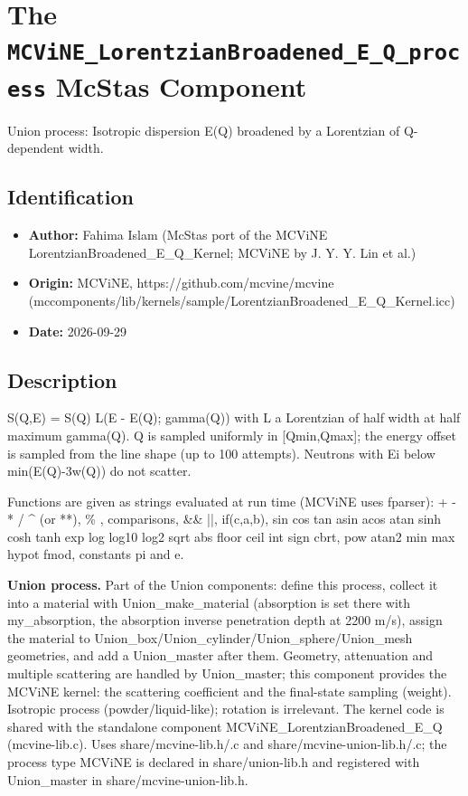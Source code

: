 \section{The \texttt{MCViNE\_LorentzianBroadened\_E\_Q\_process} McStas Component}
Union process: Isotropic dispersion E(Q) broadened by a Lorentzian of Q-dependent width.

\subsection*{Identification}
\begin{itemize}
  \item \textbf{Author:} Fahima Islam (McStas port of the MCViNE LorentzianBroadened\_E\_Q\_Kernel; MCViNE by J. Y. Y. Lin et al.)
  \item \textbf{Origin:} MCViNE, https://github.com/mcvine/mcvine (mccomponents/lib/kernels/sample/LorentzianBroadened\_E\_Q\_Kernel.icc)
  \item \textbf{Date:} 2026-09-29
\end{itemize}

\subsection*{Description}
S(Q,E) = S(Q) L(E - E(Q); gamma(Q)) with L a Lorentzian of half width at half maximum gamma(Q). Q is sampled uniformly in [Qmin,Qmax]; the energy offset is sampled from the line shape (up to 100 attempts). Neutrons with Ei below min(E(Q)-3w(Q)) do not scatter.

Functions are given as strings evaluated at run time (MCViNE uses fparser): + - * / \textasciicircum{} (or **), \% , comparisons, \&\& ||, if(c,a,b), sin cos tan asin acos atan sinh cosh tanh exp log log10 log2 sqrt abs floor ceil int sign cbrt, pow atan2 min max hypot fmod, constants pi and e.

\textbf{Union process.} Part of the Union components: define this process, collect it into a material with Union\_make\_material (absorption is set there with my\_absorption, the absorption inverse penetration depth at 2200 m/s), assign the material to Union\_box/Union\_cylinder/Union\_sphere/Union\_mesh geometries, and add a Union\_master after them. Geometry, attenuation and multiple scattering are handled by Union\_master; this component provides the MCViNE kernel: the scattering coefficient and the final-state sampling (weight). Isotropic process (powder/liquid-like); rotation is irrelevant. The kernel code is shared with the standalone component MCViNE\_LorentzianBroadened\_E\_Q (mcvine-lib.c). Uses share/mcvine-lib.h/.c and share/mcvine-union-lib.h/.c; the process type MCViNE is declared in share/union-lib.h and registered with Union\_master in share/mcvine-union-lib.h.


